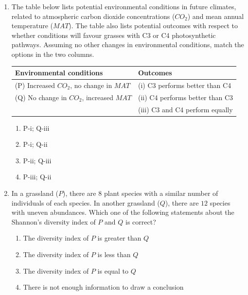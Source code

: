 \documentclass[journal]{IEEEtran}
\begin{document}
\begin{enumerate}
    \item The table below lists potential environmental conditions in future climates, related to atmospheric carbon dioxide concentrations ($CO_2$) and mean annual temperature ($MAT$).
The table also lists potential outcomes with respect to whether conditions will favour grasses with C3 or C4 photosynthetic pathways.
Assuming no other changes in environmental conditions, match the options in the two columns.
\begin{center}
    \begin{tabular}{|l|l|}
        \hline
        \textbf{Environmental conditions} & \textbf{Outcomes} \\ \hline
        (P) Increased $CO_2$, no change in $MAT$ & (i) C3 performs better than C4 \\
        (Q) No change in $CO_2$, increased $MAT$ & (ii) C4 performs better than C3 \\
         & (iii) C3 and C4 perform equally \\ \hline
    \end{tabular}
    \end{center}
    \begin{multicols}{2}
  
  \begin{enumerate}
        \item P-i;
Q-iii
        \item P-i; Q-ii
        \item P-ii;
Q-iii
        \item P-iii;
Q-ii
    \end{enumerate}
    \end{multicols}
    
    \item In a grassland ($P$), there are $8$ plant species with a similar number of individuals of each species.
In another grassland ($Q$), there are $12$ species with uneven abundances.
Which one of the following statements about the Shannon's diversity index of $P$ and $Q$ is correct?
\begin{enumerate}
        \item The diversity index of $P$ is greater than $Q$
        \item The diversity index of $P$ is less than $Q$
        \item The diversity index of $P$ is equal to $Q$
        \item There is not enough information to draw a conclusion
    \end{enumerate}
    

\end{enumerate}
\end{document}
